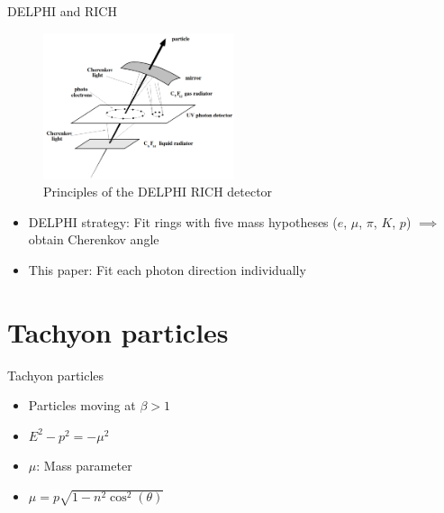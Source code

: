 \documentclass{beamer}
\begin{document}
\begin{frame}{DELPHI and RICH}
  \begin{figure}
    \centering
    \includegraphics[width = 0.50\textwidth]{Cherenkov.png}
    \caption{Principles of the DELPHI RICH detector}
  \end{figure}
  \begin{itemize}
    \item{DELPHI strategy: Fit rings with five mass hypotheses ($e$, $\mu$, $\pi$, $K$, $p$) $\implies$ obtain Cherenkov angle}
    \item{This paper: Fit each photon direction individually}
  \end{itemize}
\end{frame}

\section{Tachyon particles}
\begin{frame}{Tachyon particles}
  \begin{itemize}
    \item{Particles moving at $\beta > 1$}
    \item{$E^2 - p^2 = -\mu^2$}
    \item{$\mu$: Mass parameter}
    \item{$\mu = p\sqrt{1 - n^2\cos^2(\theta)}$}
  \end{itemize}
\end{frame}
\end{document}
